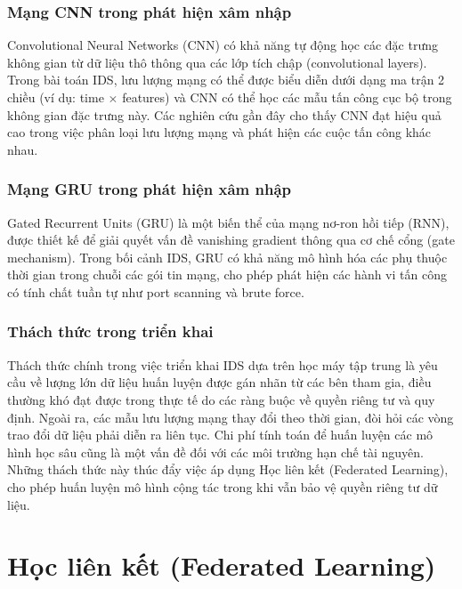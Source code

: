 \subsubsection{Mạng CNN trong phát hiện xâm nhập}
Convolutional Neural Networks (CNN) có khả năng tự động học các đặc trưng không gian từ dữ liệu thô thông qua các lớp tích chập (convolutional layers). Trong bài toán IDS, lưu lượng mạng có thể được biểu diễn dưới dạng ma trận 2 chiều (ví dụ: time $\times$ features) và CNN có thể học các mẫu tấn công cục bộ trong không gian đặc trưng này. Các nghiên cứu gần đây cho thấy CNN đạt hiệu quả cao trong việc phân loại lưu lượng mạng và phát hiện các cuộc tấn công khác nhau.

\subsubsection{Mạng GRU trong phát hiện xâm nhập}
Gated Recurrent Units (GRU) là một biến thể của mạng nơ-ron hồi tiếp (RNN), được thiết kế để giải quyết vấn đề vanishing gradient thông qua cơ chế cổng (gate mechanism). Trong bối cảnh IDS, GRU có khả năng mô hình hóa các phụ thuộc thời gian trong chuỗi các gói tin mạng, cho phép phát hiện các hành vi tấn công có tính chất tuần tự như port scanning và brute force.

\subsubsection{Thách thức trong triển khai}
Thách thức chính trong việc triển khai IDS dựa trên học máy tập trung là yêu cầu về lượng lớn dữ liệu huấn luyện được gán nhãn từ các bên tham gia, điều thường khó đạt được trong thực tế do các ràng buộc về quyền riêng tư và quy định. Ngoài ra, các mẫu lưu lượng mạng thay đổi theo thời gian, đòi hỏi các vòng trao đổi dữ liệu phải diễn ra liên tục. Chi phí tính toán để huấn luyện các mô hình học sâu cũng là một vấn đề đối với các môi trường hạn chế tài nguyên. Những thách thức này thúc đẩy việc áp dụng Học liên kết (Federated Learning), cho phép huấn luyện mô hình cộng tác trong khi vẫn bảo vệ quyền riêng tư dữ liệu.

\section{Học liên kết (Federated Learning)}
\label{sec:fl}

